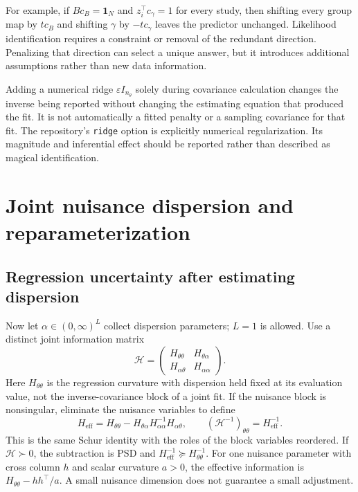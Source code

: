 For example, if $Bc_B=\mathbf1_N$ and $z_i^\top c_\gamma=1$
for every study, then shifting every group map by $tc_B$ and
shifting $\gamma$ by $-tc_\gamma$ leaves the predictor unchanged.
Likelihood identification requires a constraint or removal of the
redundant direction.  Penalizing that direction can select a unique
answer, but it introduces additional assumptions rather than new data
information.

Adding a numerical ridge $\varepsilon I_{n_\theta}$ solely during
covariance calculation changes the inverse being reported without
changing the estimating equation that produced the fit.  It is not
automatically a fitted penalty or a sampling covariance for that fit.
The repository's \texttt{ridge} option is explicitly numerical
regularization.  Its magnitude and inferential effect should be
reported rather than described as magical identification.

\section{Joint nuisance dispersion and reparameterization}
\label{cov-dispersion}

\subsection{Regression uncertainty after estimating dispersion}
\label{cov-nuisance-schur}

Now let $\alpha\in(0,\infty)^L$ collect dispersion parameters; $L=1$ is
allowed.  Use a distinct joint information matrix
\[
 \mathcal H=
 \begin{pmatrix}
 H_{\theta\theta}&H_{\theta\alpha}\\
 H_{\alpha\theta}&H_{\alpha\alpha}
 \end{pmatrix}.
\]
Here $H_{\theta\theta}$ is the regression curvature with dispersion held
fixed at its evaluation value, not the inverse-covariance block of a
joint fit.  If the nuisance block is nonsingular, eliminate the
nuisance variables to define
\begin{equation}
 H_{\mathrm{eff}}=
 H_{\theta\theta}
   -H_{\theta\alpha}H_{\alpha\alpha}^{-1}H_{\alpha\theta},
 \qquad
 (\mathcal H^{-1})_{\theta\theta}=H_{\mathrm{eff}}^{-1}.
 \label{cov-nuisance-adjustment}
\end{equation}
This is the same Schur identity with the roles of the block variables
reordered.  If $\mathcal H\succ0$, the subtraction is PSD and
$H_{\mathrm{eff}}^{-1}\succeq H_{\theta\theta}^{-1}$.
For one nuisance parameter with cross column $h$ and scalar
curvature $a>0$, the effective information is
$H_{\theta\theta}-hh^\top/a$.  A small nuisance dimension does not
guarantee a small adjustment.

